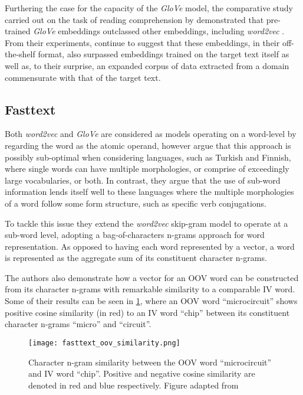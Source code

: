 \documentclass[../../fyp.tex]{subfiles}
\begin{document}
Furthering the case for the capacity of the \textit{GloVe} model, the comparative study carried out on the task of reading comprehension by \cite{bhuwandhingra2017} demonstrated that pre-trained \textit{GloVe} embeddings outclassed other embeddings, including \textit{word2vec} \cite{mikolov2013}. From their experiments, \cite{bhuwandhingra2017} continue to suggest that these embeddings, in their off-the-shelf format, also surpassed embeddings trained on the target text itself as well as, to their surprise, an expanded corpus of data extracted from a domain commensurate with that of the target text.

\subsection{Fasttext}
Both \textit{word2vec} and \textit{GloVe} are considered as models operating on a word-level by regarding the word as the atomic operand, however \cite{bojanowski2017} argue that this approach is possibly sub-optimal when considering languages, such as Turkish and Finnish, where single words can have multiple morphologies, or comprise of exceedingly large vocabularies, or both. In contrast, they argue that the use of sub-word information lends itself well to these languages where the multiple morphologies of a word follow some form structure, such as specific verb conjugations.

To tackle this issue they extend the \textit{word2vec} skip-gram model to operate at a sub-word level, adopting a bag-of-characters n-grams approach for word representation. As opposed to having each word represented by a vector, a word is represented as the aggregate sum of its constituent character n-grams.

The authors also demonstrate how a vector for an OOV word can be constructed from its character n-grams with remarkable similarity to a comparable IV word. Some of their results can be seen in \ref{fig:fasttext_oov_similarity}, where an OOV word \enquote{microcircuit} shows positive cosine similarity (in red) to an IV word \enquote{chip} between its constituent character n-grams \enquote{micro} and \enquote{circuit}.

\begin{figure}[!ht]
	\centering
	\texttt{[image: fasttext\_oov\_similarity.png]}
	\caption{Character n-gram similarity between the OOV word \enquote{microcircuit} and IV word \enquote{chip}. Positive and negative cosine similarity are denoted in red and blue respectively. Figure adapted from \cite{bojanowski2017}}
	\label{fig:fasttext_oov_similarity}
\end{figure}

\end{document}
